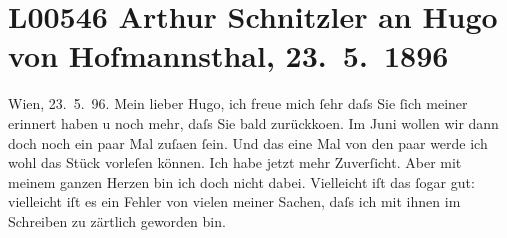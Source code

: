 

\section[Arthur Schnitzler an Hugo von Hofmannsthal, 23. 5. 1896]{L00546 Arthur Schnitzler an Hugo von Hofmannsthal, 23. 5. 1896}
\nopagebreak{}
\rehead{ }\normalsize\beginnumbering{}
\toendnotes[C]{\smallbreak\pagebreak[2]}
\toendnotes[C]{\smallbreak}
\pstart
           \raggedleft{}{\pb}Wien, 23. 5. 96.\pend
           \vspace{0.5em}
\pstart
           Mein lieber Hugo, ich freue mich ſehr daſs Sie ſich meiner erinnert
               haben u noch mehr, daſs Sie bald zurückko{\geminationm}en. Im
                  Juni wollen wir dann doch noch ein paar Mal zuſa{\geminationm}en ſein. Und das eine Mal von den paar werde ich wohl
               das Stück vorleſen können. Ich
               habe jetzt mehr Zuverſicht. Aber mit meinem ganzen Herzen bin ich doch nicht dabei.
               Vielleicht iſt das ſogar gut: vielleicht {\pb}iſt es ein
               Fehler von vielen meiner Sachen, daſs ich mit ihnen im Schreiben zu zärtlich geworden
               bin.\pend
           
